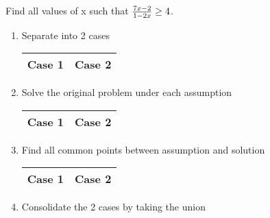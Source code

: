 \begin{exercise}\nonumber
	Find all values of x such that $ {7x - 2 \over 1 - 2x} \ge 4 $. \\

	\begin{enumerate}
		\item
		      Separate into 2 cases \\
		      \begin{table}[H]
			      \centering
			      \begin{tabular}{|c|c|} \hline
				      \textbf{\hspace{2cm}Case 1\hspace{2cm}} & \textbf{\hspace{2cm}Case 2\hspace{2cm}} \\ \hline
			      \end{tabular}
		      \end{table}
		      \vspace{2cm}

		\item
		      Solve the original problem under each assumption \\
		      \begin{table}[H]
			      \centering
			      \begin{tabular}{|c|c|} \hline
				      \textbf{\hspace{2cm}Case 1\hspace{2cm}} & \textbf{\hspace{2cm}Case 2\hspace{2cm}} \\ \hline
			      \end{tabular}
		      \end{table}
		      \vspace{3cm}

		\item
		      Find all common points between assumption and solution \\
		      \begin{table}[H]
			      \centering
			      \begin{tabular}{|c|c|} \hline
				      \textbf{\hspace{2cm}Case 1\hspace{2cm}} & \textbf{\hspace{2cm}Case 2\hspace{2cm}} \\ \hline
			      \end{tabular}
		      \end{table}
		      \vspace{3cm}

		\item
		      Consolidate the 2 cases by taking the union \\
		      \\
	\end{enumerate}
\end{exercise}

